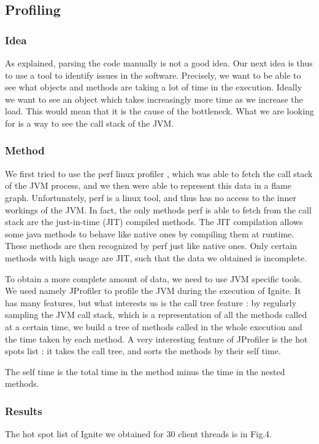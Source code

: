 \documentclass[conference]{IEEEtran}
\begin{document}
\subsection{Profiling}
\subsubsection{Idea}
As explained, parsing the code manually is not a good idea. Our next idea is thus to use a tool to identify issues in the software. Precisely, we want to be able to see what objects and methods are taking a lot of time in the execution. Ideally we want to see an object which takes increasingly more time as we increase the load. This would mean that it is the cause of the bottleneck. What we are looking for is a way to see the call stack of the JVM. 

\subsubsection{Method}
We first tried to use the perf linux profiler \cite{perf}, which was able to fetch the call stack of the JVM process, and we then were able to represent this data in a flame graph. Unfortunately, perf is a linux tool, and thus has no access to the inner workings of the JVM. In fact, the only methods perf is able to fetch from the call stack are the just-in-time (JIT) compiled methods. The JIT compilation allows some java methods to behave like native ones by compiling them at runtime. These methods are then recognized by perf just like native ones. Only certain methods with high usage are JIT, such that the data we obtained is incomplete.

To obtain a more complete amount of data, we need to use JVM specific tools. We used namely JProfiler \cite{jprofiler} to profile the JVM during the execution of Ignite. It has many features, but what interests us is the call tree feature : by regularly sampling the JVM call stack, which is a representation of all the methods called at a certain time, we build a tree of methods called in the whole execution and the time taken by each method. A very interesting feature of JProfiler is the hot spots list : it takes the call tree, and sorts the methods by their self time.

The self time is the total time in the method minus the time in the nested methods.

\subsubsection{Results}
The hot spot list of Ignite we obtained for 30 client threads is in Fig.4.
\end{document}
